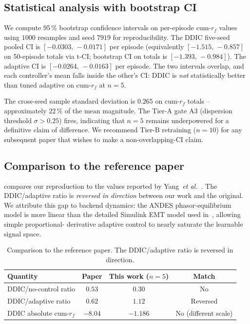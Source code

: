 \documentclass[journal,onecolumn,11pt]{IEEEtran}
\begin{document}
\subsection{Statistical analysis with bootstrap CI}

We compute 95\,\% bootstrap confidence intervals on per-episode
cum-$r_f$ values using $1000$ resamples and seed $7919$ for
reproducibility. The DDIC five-seed pooled CI is
$[-0.0303,\,-0.0171]$ per episode (equivalently $[-1.515,\,-0.857]$ on
50-episode totals via t-CI; bootstrap CI on totals is
$[-1.393,\,-0.984]$). The adaptive CI is $[-0.0264,\,-0.0163]$
per episode. The two intervals overlap, and each controller's mean
falls inside the other's CI: DDIC is \emph{not} statistically better
than tuned adaptive on cum-$r_f$ at $n = 5$.

The cross-seed sample standard deviation is $0.265$ on cum-$r_f$
totals -- approximately $22\,\%$ of the mean magnitude. The Tier-A
gate A3 (dispersion threshold $\sigma > 0.25$) fires, indicating that
$n = 5$ remains underpowered for a definitive claim of difference.
We recommend Tier-B retraining ($n = 10$) for any subsequent paper
that wishes to make a non-overlapping-CI claim.

\subsection{Comparison to the reference paper}

 compares our reproduction to the values reported
by Yang~\emph{et al.}~\cite{yang2023ddic}. The DDIC/adaptive ratio is
\emph{reversed in direction} between our work and the original. We
attribute this gap to backend dynamics: the ANDES
phasor-equilibrium model is more linear than the detailed Simulink EMT
model used in~\cite{yang2023ddic}, allowing simple proportional-
derivative adaptive control to nearly saturate the learnable signal
space.

\begin{table}[!t]
  \centering
  \caption{Comparison to the reference paper. The DDIC/adaptive ratio
  is reversed in direction.}
  \label{tab:vs-paper}
  \begin{tabular}{lccc}
    \toprule
    Quantity & Paper & This work ($n=5$) & Match \\
    \midrule
    DDIC/no-control ratio  & $0.53$ & $0.30$ & No \\
    DDIC/adaptive ratio    & $\mathbf{0.62}$ & $\mathbf{1.12}$ & Reversed \\
    DDIC absolute cum-$r_f$ & $-8.04$ & $-1.186$ & No (different scale) \\
    \bottomrule
  \end{tabular}
\end{table}
\end{document}
